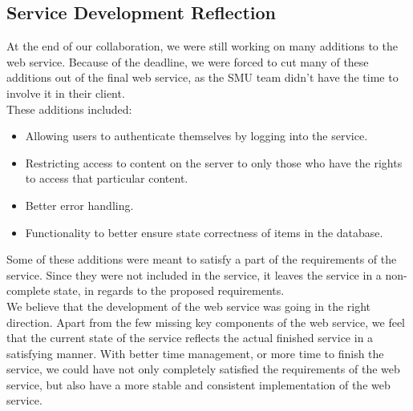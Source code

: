 \documentclass[10pt,a4paper]{article}
\begin{document}
\subsection{Service Development Reflection}
At the end of our collaboration, we were still working on many additions to the web service. Because of the deadline, we were forced to cut many of these additions out of the final web service, as the SMU team didn’t have the time to involve it in their client.\\
These additions included:
\begin{itemize}
\item Allowing users to authenticate themselves by logging into the service.
\item Restricting access to content on the server to only those who have the rights to access that particular content.
\item Better error handling.
\item Functionality to better ensure state correctness of items in the database.
\end{itemize}
Some of these additions were meant to satisfy a part of the requirements of the service. Since they were not included in the service, it leaves the service in a non-complete state, in regards to the proposed requirements.\\
We believe that the development of the web service was going in the right direction. Apart from the few missing key components of the web service, we feel that the current state of the service reflects the actual finished service in a satisfying manner. With better time management, or more time to finish the service, we could have not only completely satisfied the requirements of the web service, but also have a more stable and consistent implementation of the web service.
\end{document}
